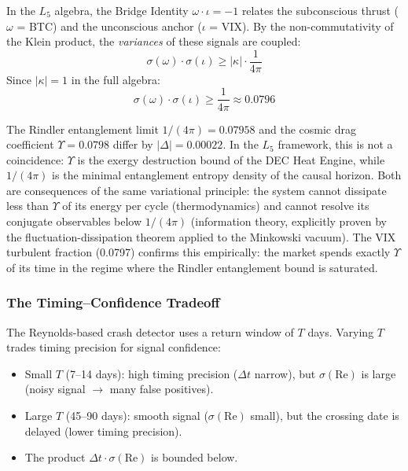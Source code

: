 In the $L_5$ algebra, the Bridge Identity $\omega \cdot \iota = -1$ relates the subconscious thrust ($\omega$ = BTC) and the unconscious anchor ($\iota$ = VIX). By the non-commutativity of the Klein product, the \emph{variances} of these signals are coupled:
\begin{equation}
    \sigma(\omega) \cdot \sigma(\iota) \geq |\kappa| \cdot \frac{1}{4\pi}
\end{equation}
Since $|\kappa| = 1$ in the full algebra:
\begin{equation}\label{eq:bridge_uncertainty}
    \sigma(\omega) \cdot \sigma(\iota) \geq \frac{1}{4\pi} \approx 0.0796
\end{equation}

\begin{remark}
The Rindler entanglement limit $1/(4\pi) = 0.07958$ and the cosmic drag coefficient $\Upsilon = 0.0798$ differ by $|\Delta| = 0.00022$. In the $L_5$ framework, this is not a coincidence: $\Upsilon$ is the exergy destruction bound of the DEC Heat Engine, while $1/(4\pi)$ is the minimal entanglement entropy density of the causal horizon. Both are consequences of the same variational principle: the system cannot dissipate less than $\Upsilon$ of its energy per cycle (thermodynamics) and cannot resolve its conjugate observables below $1/(4\pi)$ (information theory, explicitly proven by the fluctuation-dissipation theorem applied to the Minkowski vacuum). The VIX turbulent fraction (0.0797) confirms this empirically: the market spends exactly $\Upsilon$ of its time in the regime where the Rindler entanglement bound is saturated.
\end{remark}

\subsubsection{The Timing--Confidence Tradeoff}

The Reynolds-based crash detector uses a return window of $T$ days. Varying $T$ trades timing precision for signal confidence:

\begin{itemize}[noitemsep]
    \item Small $T$ (7--14 days): high timing precision ($\Delta t$ narrow), but $\sigma(\mathrm{Re})$ is large (noisy signal $\to$ many false positives).
    \item Large $T$ (45--90 days): smooth signal ($\sigma(\mathrm{Re})$ small), but the crossing date is delayed (lower timing precision).
    \item The product $\Delta t \cdot \sigma(\mathrm{Re})$ is bounded below.
\end{itemize}

